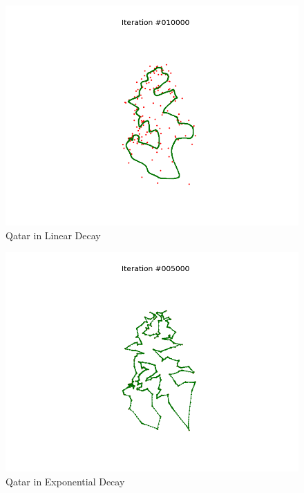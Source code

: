 \documentclass[11pt]{article}
\begin{document}
\begin{figure}[!ht]
  \centering
  \includegraphics[scale=0.6]{q_l.png}
  \caption{Qatar in Linear Decay}
\end{figure}

\begin{figure}[!ht]
  \centering
  \includegraphics[scale=0.6]{q_e.png}
  \caption{Qatar in Exponential Decay}
\end{figure}
\end{document}
